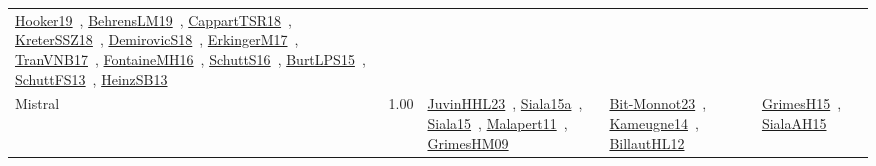 {\begin{longtable}{p{3cm}r>{\raggedright\arraybackslash}p{6cm}>{\raggedright\arraybackslash}p{6cm}>{\raggedright\arraybackslash}p{8cm}}
\href{../works/Hooker19.pdf}{Hooker19}~\cite{Hooker19}, \href{../works/BehrensLM19.pdf}{BehrensLM19}~\cite{BehrensLM19}, \href{../works/CappartTSR18.pdf}{CappartTSR18}~\cite{CappartTSR18}, \href{../works/KreterSSZ18.pdf}{KreterSSZ18}~\cite{KreterSSZ18}, \href{../works/DemirovicS18.pdf}{DemirovicS18}~\cite{DemirovicS18}, \href{../works/ErkingerM17.pdf}{ErkingerM17}~\cite{ErkingerM17}, \href{../works/TranVNB17.pdf}{TranVNB17}~\cite{TranVNB17}, \href{../works/FontaineMH16.pdf}{FontaineMH16}~\cite{FontaineMH16}, \href{../works/SchuttS16.pdf}{SchuttS16}~\cite{SchuttS16}, \href{../works/BurtLPS15.pdf}{BurtLPS15}~\cite{BurtLPS15}, \href{../works/SchuttFS13.pdf}{SchuttFS13}~\cite{SchuttFS13}, \href{../works/HeinzSB13.pdf}{HeinzSB13}~\cite{HeinzSB13}\\
\index{Mistral}\index{CPSystems!Mistral}Mistral &  1.00 & \href{../works/JuvinHHL23.pdf}{JuvinHHL23}~\cite{JuvinHHL23}, \href{../works/Siala15a.pdf}{Siala15a}~\cite{Siala15a}, \href{../works/Siala15.pdf}{Siala15}~\cite{Siala15}, \href{../works/Malapert11.pdf}{Malapert11}~\cite{Malapert11}, \href{../works/GrimesHM09.pdf}{GrimesHM09}~\cite{GrimesHM09} & \href{../works/Bit-Monnot23.pdf}{Bit-Monnot23}~\cite{Bit-Monnot23}, \href{../works/Kameugne14.pdf}{Kameugne14}~\cite{Kameugne14}, \href{../works/BillautHL12.pdf}{BillautHL12}~\cite{BillautHL12} & \href{../works/GrimesH15.pdf}{GrimesH15}~\cite{GrimesH15}, \href{../works/SialaAH15.pdf}{SialaAH15}~\cite{SialaAH15}\\

\end{longtable}}
